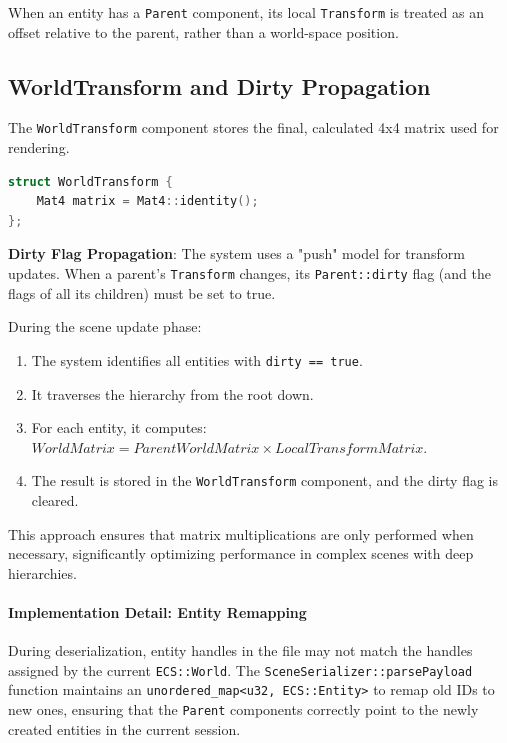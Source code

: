 When an entity has a \texttt{Parent} component, its local \texttt{Transform} is treated as an offset relative to the parent, rather than a world-space position.

\subsection{WorldTransform and Dirty Propagation}

The \texttt{WorldTransform} component stores the final, calculated 4x4 matrix used for rendering.

\begin{lstlisting}[language=C++]
struct WorldTransform {
    Mat4 matrix = Mat4::identity();
};
\end{lstlisting}

\textbf{Dirty Flag Propagation}:
The system uses a "push" model for transform updates. When a parent's \texttt{Transform} changes, its \texttt{Parent::dirty} flag (and the flags of all its children) must be set to true. 

During the scene update phase:
\begin{enumerate}
    \item The system identifies all entities with \texttt{dirty == true}.
    \item It traverses the hierarchy from the root down.
    \item For each entity, it computes: $WorldMatrix = ParentWorldMatrix \times LocalTransformMatrix$.
    \item The result is stored in the \texttt{WorldTransform} component, and the dirty flag is cleared.
\end{enumerate}

This approach ensures that matrix multiplications are only performed when necessary, significantly optimizing performance in complex scenes with deep hierarchies.


\paragraph{Implementation Detail: Entity Remapping}

During deserialization, entity handles in the file may not match the handles assigned by the current \texttt{ECS::World}. The \texttt{SceneSerializer::parsePayload} function maintains an \texttt{unordered\_map<u32, ECS::Entity>} to remap old IDs to new ones, ensuring that the \texttt{Parent} components correctly point to the newly created entities in the current session.


